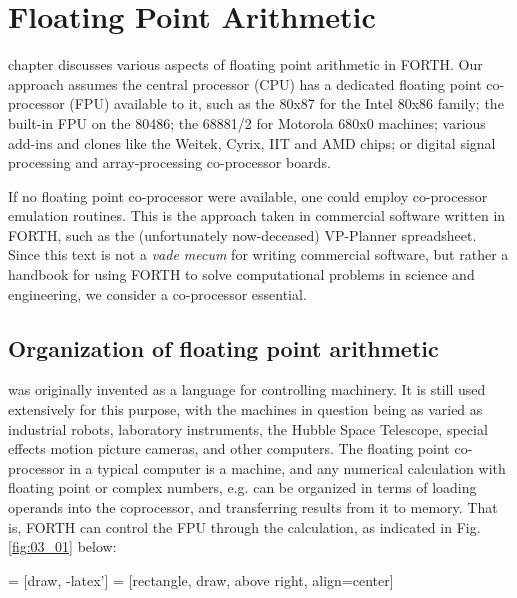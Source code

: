 
\chapter{Floating Point Arithmetic}

\addtocounter{equation}{1} %

\tableofcontents

 chapter discusses various aspects of floating point arithmetic in
FORTH. Our approach assumes the central processor (CPU) has a dedicated floating
point co-processor (FPU)
available to it, such as the 80x87 for the Intel 80x86 family; the
built-in FPU on the 80486; the 68881/2 for Motorola 680x0
machines; various add-ins and clones like the Weitek, Cyrix, IIT
and AMD chips; or digital signal processing and array-processing
co-processor boards.

If no floating point co-processor were available, one could
employ co-processor emulation routines. This is the approach
taken in commercial software written in FORTH, such as the
(unfortunately now-deceased) VP-Planner spreadsheet. Since
this text is not a \textit{vade mecum} for writing commercial software, but
rather a handbook for using FORTH to solve computational
problems in science and engineering, we consider a co-processor
essential.

\section{Organization of floating point arithmetic}

 was originally invented as a language for controlling 
machinery. It is still used extensively for this purpose, with the
machines in question being as varied as industrial robots,
laboratory instruments, the Hubble Space Telescope, special
effects motion picture cameras, and other computers. The floating point
co-processor in a typical computer is a machine, and any
numerical calculation with floating point or complex numbers,
e.g. can be organized in terms of loading operands into the
coprocessor, and transferring results from it to memory. That is,
FORTH can control the FPU through the calculation, as indicated in Fig.
\ref{fig:03_01} below:

 = [draw, -latex']
 = [rectangle, draw, above right, align=center]

